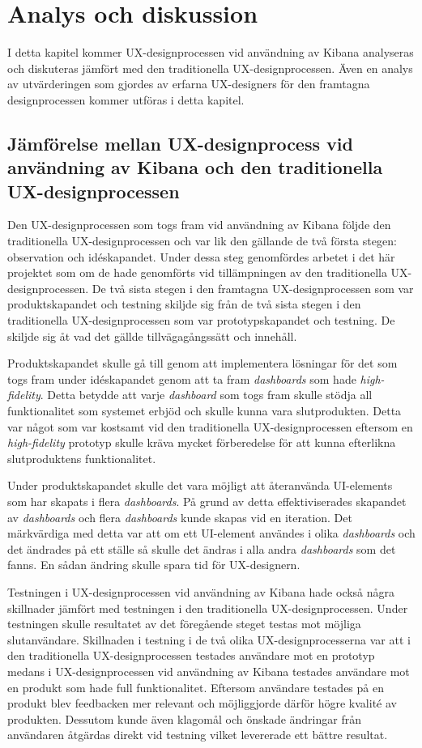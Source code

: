 \documentclass[12pt]{kththesis}
\begin{document}
\afterpage{\null\newpage}

\chapter{Analys och diskussion}
I detta kapitel kommer UX-designprocessen vid användning av Kibana analyseras och diskuteras jämfört med den traditionella UX-designprocessen. Även en analys av utvärderingen som gjordes av erfarna UX-designers för den framtagna designprocessen kommer utföras i detta kapitel. 

\section{ Jämförelse mellan UX-designprocess vid användning av Kibana och den traditionella UX-designprocessen}
Den UX-designprocessen som togs fram vid användning av Kibana följde den traditionella UX-designprocessen och var lik den gällande de två första stegen: observation och idéskapandet. Under dessa steg genomfördes arbetet i det här projektet som om de hade genomförts vid tillämpningen av den traditionella UX-designprocessen. De två sista stegen i den framtagna UX-designprocessen som var produktskapandet och testning skiljde sig från de två sista stegen i den traditionella UX-designprocessen som var prototypskapandet och testning. De skiljde sig åt vad det gällde tillvägagångssätt och innehåll. 

Produktskapandet skulle gå till genom att implementera lösningar för det som togs fram under idéskapandet genom att ta fram \textit{dashboards} som hade \textit{high-fidelity}. Detta betydde att varje \textit{dashboard} som togs fram skulle stödja all funktionalitet som systemet erbjöd och skulle kunna vara slutprodukten. Detta var något som var kostsamt vid den traditionella UX-designprocessen eftersom en \textit{high-fidelity} prototyp skulle kräva mycket förberedelse för att kunna efterlikna slutproduktens funktionalitet. 

Under produktskapandet skulle det vara möjligt att återanvända UI-elements som har skapats i flera \textit{dashboards}. På grund av detta effektiviserades skapandet av \textit{dashboards} och flera \textit{dashboards} kunde skapas vid en iteration. Det märkvärdiga med detta var att om ett UI-element användes i olika \textit{dashboards} och det ändrades på ett ställe så skulle det ändras i alla andra \textit{dashboards} som det fanns. En sådan ändring skulle spara tid för UX-designern. 

Testningen i UX-designprocessen vid användning av Kibana hade också några skillnader jämfört med testningen i den traditionella UX-designprocessen. Under testningen skulle resultatet av det föregående steget testas mot möjliga slutanvändare. Skillnaden i testning i de två olika UX-designprocesserna var att i den traditionella UX-designprocessen testades användare mot en prototyp medans i UX-designprocessen vid användning av Kibana testades användare mot en produkt som hade full funktionalitet. Eftersom användare testades på en produkt blev feedbacken mer relevant och möjliggjorde därför högre kvalité av produkten. Dessutom kunde även klagomål och önskade ändringar från användaren åtgärdas direkt vid testning vilket levererade ett bättre resultat.
\end{document}
